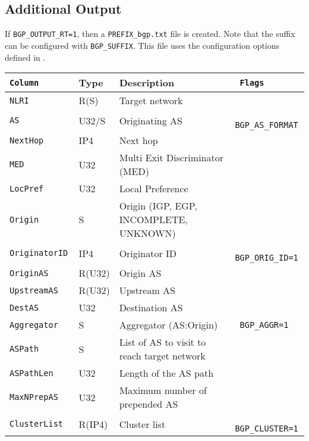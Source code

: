 \documentclass[documentation]{subfiles}
\begin{document}
\subsection{Additional Output}\label{bgp:cfo}
If {\tt BGP\_OUTPUT\_RT=1}, then a {\tt PREFIX\_bgp.txt} file is created. Note that the suffix can be configured with {\tt BGP\_SUFFIX}. This file uses the configuration options defined in .
\begin{longtable}{>{\tt}lll>{\tt\small}l}
    \toprule
    {\bf Column} & {\bf Type} & {\bf Description} & {\bf Flags}\\
    \midrule\endhead%
    NLRI            & R(S)   & Target network                                        & \\
    AS              & U32/S  & Originating AS                                        & BGP\_AS\_FORMAT\\
    NextHop         & IP4    & Next hop                                              & \\
    MED             & U32    & Multi Exit Discriminator (MED)                        & \\
    LocPref         & U32    & Local Preference                                      & \\
    Origin          & S      & Origin (IGP, EGP, INCOMPLETE, UNKNOWN)                & \\
    OriginatorID    & IP4    & Originator ID                                         & BGP\_ORIG\_ID=1\\
    OriginAS        & R(U32) & Origin AS                                             & \\
    UpstreamAS      & R(U32) & Upstream AS                                           & \\
    DestAS          & U32    & Destination AS                                        & \\
    Aggregator      & S      & Aggregator (AS:Origin)                                & BGP\_AGGR=1\\
    ASPath          & S      & List of AS to visit to reach target network           & \\
    ASPathLen       & U32    & Length of the AS path                                 & \\
    MaxNPrepAS      & U32    & Maximum number of prepended AS                        & \\
    ClusterList     & R(IP4) & Cluster list                                          & BGP\_CLUSTER=1\\

\end{longtable}
\end{document}
